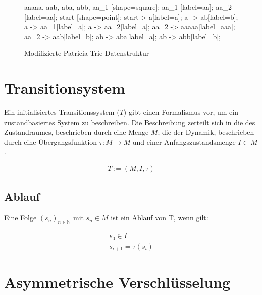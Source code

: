 \documentclass[a4paper,12pt]{report}
\begin{document}
\begin{figure}[ht]
    \centering
    {
      aaaaa, aab, aba, abb, aa_1 [shape=square];
      aa_1 [label=aa];
      aa_2 [label=aa];
      start [shape=point];
      start-> a[label=a];
      a -> ab[label=b];
      a -> aa_1[label=a];
      a -> aa_2[label=a];
      aa_2 -> aaaaa[label=aaa];
      aa_2 -> aab[label=b];
      ab -> aba[label=a];
      ab -> abb[label=b]; 
    }
    \caption{Modifizierte Patricia-Trie Datenstruktur}
    \label{trieImg4}
\end{figure}

\section{Transitionsystem}
\label{transSys}

Ein initialisiertes Transitionssystem ($T$) \cite{Glausch} gibt einen Formalismus vor, um ein zustandbasiertes System zu beschreiben. Die Beschreibung zerteilt sich in die des Zustandraumes, beschrieben durch eine Menge $M$; die der Dynamik, beschrieben durch eine Übergangsfunktion $\tau: M \rightarrow M$ und einer Anfangszustandsmenge $I\subset M$.

\begin{eqnarray}
   T := (M,I,\tau)
\end{eqnarray}

\subsection*{Ablauf}
Eine Folge $(s_n)_{n\in\mathbb{N}}$ mit $s_n\in M$ ist ein Ablauf von T, wenn gilt:

\begin{eqnarray}
   s_0 \in I \\
   s_{i+1} = \tau(s_i) 
\end{eqnarray}


\section{Asymmetrische Verschlüsselung}
\label{crypt}

\end{document}
